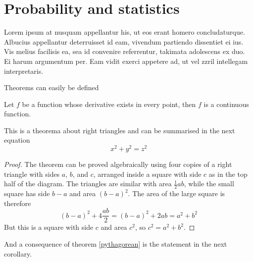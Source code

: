 
\chapter{Probability and statistics}
Lorem ipsum at nusquam appellantur his, ut eos erant homero
concludaturque. Albucius appellantur deterruisset id eam, vivendum
partiendo dissentiet ei ius. Vis melius facilisis ea, sea id convenire
referrentur, takimata adolescens ex duo. Ei harum argumentum per. Eam
vidit exerci appetere ad, ut vel zzril intellegam interpretaris.

Theorems can easily be defined

\begin{definition}
  Let $f$ be a function whose derivative exists in every point, then $f$ is 
  a continuous function.
\end{definition}

\begin{theorem}
  \label{pythagorean}
  This is a theorema about right triangles and can be summarised in the next 
  equation 
  \[ x^2 + y^2 = z^2 \]
\end{theorem}

\begin{proof}
  The theorem can be proved algebraically using four copies of a right triangle with sides $a$, $b$, and $c$, arranged inside a square with side $c$ as in the top half of the diagram. The triangles are similar with area $\tfrac12ab$, while the small square has side $b-a$ and area $(b-a)^2$. The area of the large square is therefore
  $$(b-a)^2+4\frac{ab}{2} = (b-a)^2+2ab = a^2+b^2$$  
  But this is a square with side $c$ and area $c^2$, so $c^2 = a^2 + b^2$.
\end{proof}

And a consequence of theorem \ref{pythagorean} is the statement in the next 
corollary.